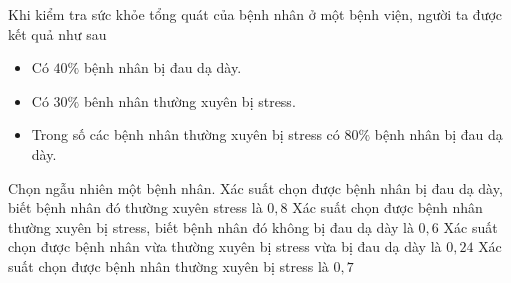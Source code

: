 

\begin{ex}%
	Khi kiểm tra sức  khỏe tổng quát của bệnh nhân ở một bệnh viện, người ta được kết quả như sau
	\begin{itemize}
		\item Có $40\%$ bệnh  nhân bị đau dạ dày.
		\item  Có $30\%$ bênh nhân thường xuyên bị stress.
		\item Trong số các bệnh nhân thường xuyên bị stress  có $80\%$ bệnh nhân bị đau dạ dày.
	\end{itemize}
	Chọn  ngẫu nhiên một bệnh nhân.
	 \choiceTF
		{\True Xác suất chọn được bệnh nhân bị đau dạ  dày, biết bệnh nhân đó thường xuyên stress là $0{,}8$}
		{Xác  suất chọn được bệnh nhân thường xuyên bị stress, biết bệnh nhân đó không bị đau dạ dày là $0{,} 6$}
		{\True Xác suất chọn được bệnh nhân vừa thường xuyên bị stress vừa bị đau dạ dày  là $0{,} 24$}
		{Xác suất chọn được bệnh nhân thường xuyên bị stress  là $0{,}7$}
\end{ex}
